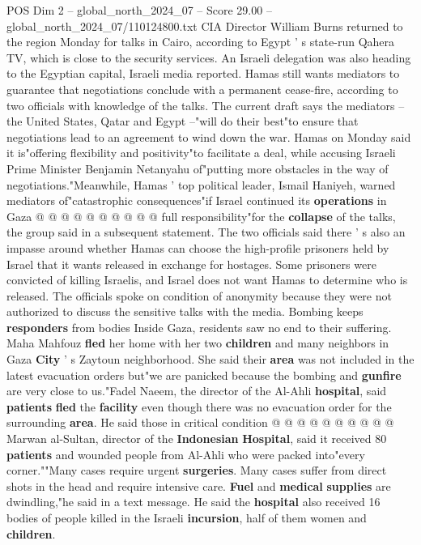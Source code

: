 \begin{textsample}{POS Dim 2 – global\_north\_2024\_07 – Score 29.00 – global\_north\_2024\_07/110124800.txt}
CIA Director William Burns returned to the region Monday for talks in Cairo, according to Egypt ' s state-run Qahera TV, which is close to the security services.
An Israeli delegation was also heading to the Egyptian capital, Israeli media reported.
Hamas still wants mediators to guarantee that negotiations conclude with a permanent cease-fire, according to two officials with knowledge of the talks.
The current draft says the mediators -- the United States, Qatar and Egypt --"will do their best"to ensure that negotiations lead to an agreement to wind down the war.
Hamas on Monday said it is"offering flexibility and positivity"to facilitate a deal, while accusing Israeli Prime Minister Benjamin Netanyahu of"putting more obstacles in the way of negotiations."Meanwhile, Hamas ' top political leader, Ismail Haniyeh, warned mediators of"catastrophic consequences"if Israel continued its \textbf{operations} in Gaza @ @ @ @ @ @ @ @ @ @ full responsibility"for the \textbf{collapse} of the talks, the group said in a subsequent statement.
The two officials said there ' s also an impasse around whether Hamas can choose the high-profile prisoners held by Israel that it wants released in exchange for hostages.
Some prisoners were convicted of killing Israelis, and Israel does not want Hamas to determine who is released.
The officials spoke on condition of anonymity because they were not authorized to discuss the sensitive talks with the media.
Bombing keeps \textbf{responders} from bodies Inside Gaza, residents saw no end to their suffering.
Maha Mahfouz \textbf{fled} her home with her two \textbf{children} and many neighbors in Gaza \textbf{City} ' s Zaytoun neighborhood.
She said their \textbf{area} was not included in the latest evacuation orders but"we are panicked because the bombing and \textbf{gunfire} are very close to us."Fadel Naeem, the director of the Al-Ahli \textbf{hospital}, said \textbf{patients} \textbf{fled} the \textbf{facility} even though there was no evacuation order for the surrounding \textbf{area}.
He said those in critical condition @ @ @ @ @ @ @ @ @ @ Marwan al-Sultan, director of the \textbf{Indonesian} \textbf{Hospital}, said it received 80 \textbf{patients} and wounded people from Al-Ahli who were packed into"every corner.""Many cases require urgent \textbf{surgeries}.
Many cases suffer from direct shots in the head and require intensive care. \textbf{Fuel} and \textbf{medical} \textbf{supplies} are dwindling,"he said in a text message.
He said the \textbf{hospital} also received 16 bodies of people killed in the Israeli \textbf{incursion}, half of them women and \textbf{children}.

\end{textsample}
